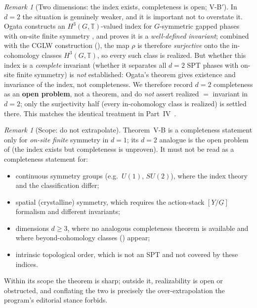 \documentclass[12pt]{article}
\newcommand{\cg}[1]{\underline{#1}}            %
\newcommand{\quotstack}[2]{[#1/#2]}            %
\newcommand{\real}{\rho}                         %
\newcommand{\Circ}{\mathbb{T}}                   %
\theoremstyle{definition}
\theoremstyle{remark}
\newtheorem{remark}[theorem]{Remark}
\begin{document}
\begin{remark}[Two dimensions: the index exists, completeness is open; V-B$'$]
\label{rem:VB2d}
In $d=2$ the situation is genuinely weaker, and it is important not to overstate it. Ogata
constructs an $H^3(G,\Circ)$-valued index for $G$-symmetric gapped phases with on-site finite
symmetry \cite{ogata-h3-index}, and proves it is a \emph{well-defined invariant}; combined
with the CGLW construction (), the map $\real$ is therefore \emph{surjective}
onto the in-cohomology classes $H^3(G,\Circ)$, so every such class is realized. But whether
this index is a \emph{complete} invariant (whether it separates all $d=2$ SPT phases with
on-site finite symmetry) is \emph{not} established: Ogata's theorem gives existence and
invariance of the index, not completeness. We therefore record $d=2$ completeness as an
\textbf{open problem}, not a theorem, and do \emph{not} assert realized $=$ invariant in
$d=2$; only the surjectivity half (every in-cohomology class is realized) is settled there.
This matches the identical treatment in Part~IV~\cite{paperEFT}.
\end{remark}

\begin{remark}[Scope: do not extrapolate]
\label{rem:VBscope}
Theorem~V-B is a completeness statement only for \emph{on-site finite} symmetry in $d=1$; its
$d=2$ analogue is the open problem of  (the index exists but completeness is
unproven). It must not be read as a completeness statement for:
\begin{itemize}
  \item continuous symmetry groups (e.g.\ $U(1)$, $SU(2)$), where the index theory and the
        classification differ;
  \item spatial (crystalline) symmetry, which requires the action-stack $\quotstack{Y}{\cg{G}}$
        formalism and different invariants;
  \item dimensions $d\ge3$, where no analogous completeness theorem is available and where
        beyond-cohomology classes () appear;
  \item intrinsic topological order, which is not an SPT and not covered by these indices.
\end{itemize}
Within its scope the theorem is sharp; outside it, realizability is open or obstructed, and
conflating the two is precisely the over-extrapolation the program's editorial stance
forbids.
\end{remark}
\end{document}
